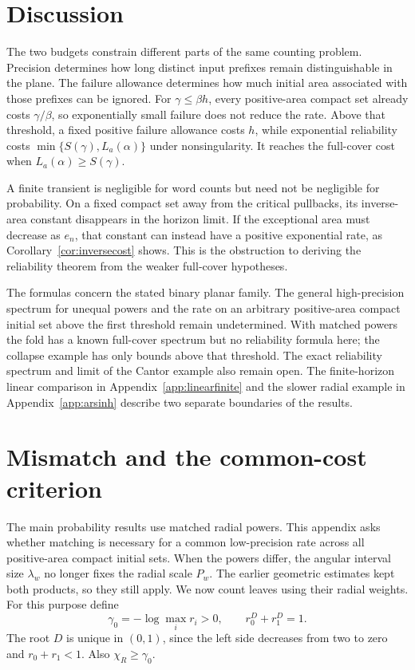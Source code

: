 \documentclass[11pt]{amsart}
\theoremstyle{definition}
\theoremstyle{remark}
\numberwithin{equation}{section}
\begin{document}
\section{Discussion}
The two budgets constrain different parts of the same counting
problem. Precision determines how long distinct input prefixes
remain distinguishable in the plane. The failure allowance
determines how much initial area associated with those prefixes
can be ignored. For $\gamma\le\beta h$, every positive-area
compact set already costs $\gamma/\beta$, so exponentially small
failure does not reduce the rate. Above that threshold, a fixed
positive failure allowance costs $h$, while exponential reliability
costs $\min\{S(\gamma),L_a(\alpha)\}$ under nonsingularity.
It reaches the full-cover cost when $L_a(\alpha)\ge S(\gamma)$.

A finite transient is negligible for word counts but need not be
negligible for probability. On a fixed compact set away from the
critical pullbacks, its inverse-area constant disappears in the
horizon limit. If the exceptional area must decrease as $e_n$,
that constant can instead have a positive exponential rate, as
Corollary~\ref{cor:inversecost} shows. This is the obstruction
to deriving the reliability theorem from the weaker full-cover
hypotheses.

The formulas concern the stated binary planar family. The general
high-precision spectrum for unequal powers and the rate on an
arbitrary positive-area compact initial set above the first threshold
remain undetermined. With matched powers the fold has a known full-cover spectrum but
no reliability formula here; the collapse example has only bounds
above that threshold. The exact reliability spectrum and limit of
the Cantor example also remain open. The finite-horizon linear
comparison in Appendix~\ref{app:linearfinite} and the slower
radial example in Appendix~\ref{app:arsinh} describe two separate
boundaries of the results.

\appendix

\section{Mismatch and the common-cost criterion}\label{sec:mismatch}

The main probability results use matched radial powers. This appendix asks
whether matching is necessary for a common low-precision rate
across all positive-area compact initial sets. When the powers differ, the angular interval size $\lambda_w$
no longer fixes the radial scale $P_w$. The earlier geometric
estimates kept both products, so they still apply. We now count
leaves using their radial weights.
For this purpose define
\[
\gamma_0=-\log\max_i r_i>0,\qquad r_0^D+r_1^D=1.
\]
The root $D$ is unique in $(0,1)$, since the left side decreases
from two to zero and $r_0+r_1<1$. Also $\chi_R\ge\gamma_0$.
\end{document}
